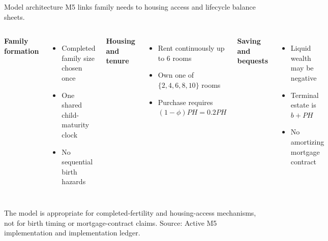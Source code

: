 \documentclass[aspectratio=169,11pt]{beamer}
\newcommand{\source}[1]{\vfill{\color{Muted}\tiny Source: #1}}
\newcommand{\tightitems}{\setlength{\itemsep}{0.55em}}
\begin{document}
\begin{frame}{Model architecture}
  \normalsize
  M5 links family needs to housing access and lifecycle balance sheets.

  \vspace{0.45em}
  \begin{columns}[T,onlytextwidth]
      \textbf{Family formation}
      \begin{itemize}\tightitems
        \item Completed family size chosen once
        \item One shared child-maturity clock
        \item No sequential birth hazards
      \end{itemize}
      \textbf{Housing and tenure}
      \begin{itemize}\tightitems
        \item Rent continuously up to 6 rooms
        \item Own one of $\{2,4,6,8,10\}$ rooms
        \item Purchase requires $(1-\phi)PH=0.2PH$
      \end{itemize}
      \textbf{Saving and bequests}
      \begin{itemize}\tightitems
        \item Liquid wealth may be negative
        \item Terminal estate is $b+PH$
        \item No amortizing mortgage contract
      \end{itemize}
  \end{columns}

  \vspace{0.2em}
  The model is appropriate for completed-fertility and housing-access mechanisms, not for birth timing or mortgage-contract claims.
  \source{Active M5 implementation and implementation ledger.}
\end{frame}
\end{document}
